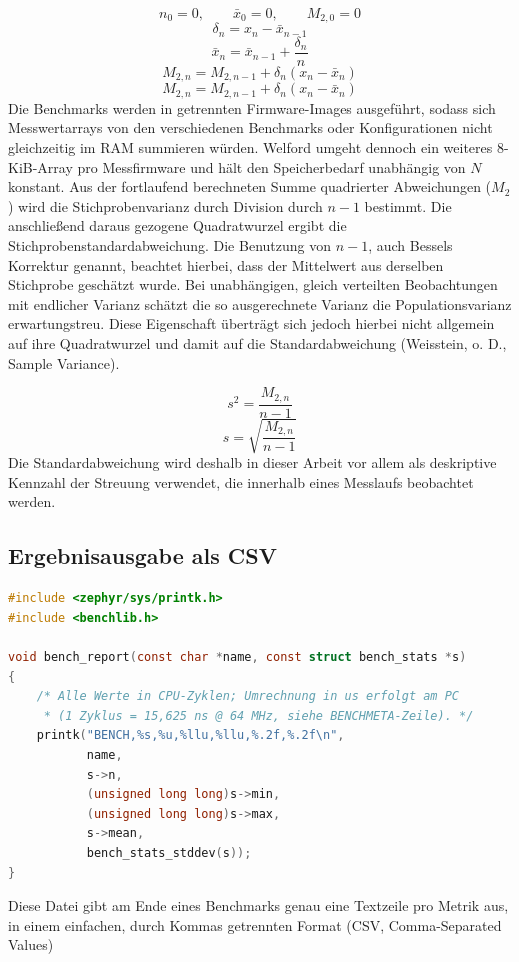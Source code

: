 \[n_0 = 0, \qquad \bar{x}_0 = 0, \qquad M_{2,0} = 0\]
\[\delta_n = x_n - \bar{x}_{n-1}\]
\[\bar{x}_n = \bar{x}_{n-1} + \frac{\delta_n}{n}\]
\[M_{2,n} = M_{2,n-1} + \delta_n \left(x_n - \bar{x}_n\right)\]
\[M_{2,n} = M_{2,n-1} + \delta_n \left(x_n - \bar{x}_n\right)\]
Die Benchmarks werden in getrennten Firmware-Images ausgef{\"u}hrt, sodass sich Messwertarrays von den verschiedenen Benchmarks oder Konfigurationen nicht gleichzeitig im RAM summieren w{\"u}rden. Welford umgeht dennoch ein weiteres 8-KiB-Array pro Messfirmware und h{\"a}lt den Speicherbedarf unabh{\"a}ngig von \(N\) konstant. Aus der fortlaufend berechneten Summe quadrierter Abweichungen (\(M_2\)) wird die Stichprobenvarianz durch Division durch \(n-1\) bestimmt. Die anschlie{\ss}end daraus gezogene Quadratwurzel ergibt die Stichprobenstandardabweichung. Die Benutzung von \(n-1\), auch Bessels Korrektur genannt, beachtet hierbei, dass der Mittelwert aus derselben Stichprobe gesch{\"a}tzt wurde. Bei unabh{\"a}ngigen, gleich verteilten Beobachtungen mit endlicher Varianz sch{\"a}tzt die so ausgerechnete Varianz die Populationsvarianz erwartungstreu. Diese Eigenschaft {\"u}bertr{\"a}gt sich jedoch hierbei nicht allgemein auf ihre Quadratwurzel und damit auf die Standardabweichung (Weisstein, o. D., \glqq{}Sample Variance\grqq{}).

\[s^2 = \frac{M_{2,n}}{n-1}\]
\[s = \sqrt{\frac{M_{2,n}}{n-1}}\]
Die Standardabweichung wird deshalb in dieser Arbeit vor allem als deskriptive Kennzahl der Streuung verwendet, die innerhalb eines Messlaufs beobachtet werden.


\subsection{Ergebnisausgabe als CSV}
\begin{lstlisting}[style=basecode,language=C]
#include <zephyr/sys/printk.h>
#include <benchlib.h>

void bench_report(const char *name, const struct bench_stats *s)
{
	/* Alle Werte in CPU-Zyklen; Umrechnung in us erfolgt am PC
	 * (1 Zyklus = 15,625 ns @ 64 MHz, siehe BENCHMETA-Zeile). */
	printk("BENCH,%s,%u,%llu,%llu,%.2f,%.2f\n",
	       name,
	       s->n,
	       (unsigned long long)s->min,
	       (unsigned long long)s->max,
	       s->mean,
	       bench_stats_stddev(s));
}
\end{lstlisting}
Diese Datei gibt am Ende eines Benchmarks genau eine Textzeile pro Metrik aus, in einem einfachen, durch Kommas getrennten Format (CSV, Comma-Separated Values)

